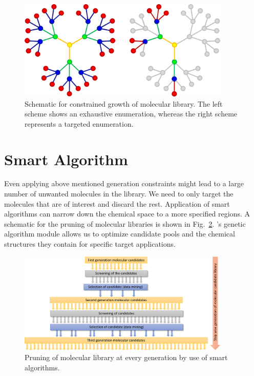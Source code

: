 \begin{figure}[htbp] 
	\centering
	\includegraphics[width=0.9\textwidth]{Chapter-4/Figures/constrained.png}
	\caption{Schematic for constrained growth of molecular library. The left scheme shows an exhaustive enumeration, whereas the right scheme represents a targeted enumeration.} 
	\label{fig:constrained} 
\end{figure}  

\section{Smart Algorithm}
Even applying above mentioned generation constraints might lead to a large number of unwanted molecules in the library. We need to only target the molecules that are of interest and discard the rest. Application of smart algorithms can narrow down the chemical space to a more specified regions. A schematic for the pruning of molecular libraries is shown in Fig.\ \ref{fig:smart_algo}. \chemlg's genetic algorithm module allows us to optimize candidate pools and the chemical structures they contain for specific target applications. 

\begin{figure}[htbp] 
	\centering
	\includegraphics[width=0.9\textwidth]{Chapter-4/Figures/smart_algo.png}
	\caption{Pruning of molecular library at every generation by use of smart algorithms.} 
	\label{fig:smart_algo} 
\end{figure}  

